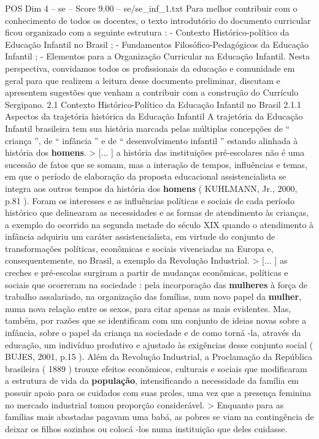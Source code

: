 \begin{textsample}{POS Dim 4 – se – Score 9.00 – se/se\_inf\_1.txt}
Para melhor contribuir com o conhecimento de todos os docentes, o texto introdutório do documento curricular ficou organizado com a seguinte estrutura : - Contexto Histórico-político da Educação Infantil no Brasil ; - Fundamentos Filosófico-Pedagógicos da Educação Infantil ; - Elementos para a Organização Curricular na Educação Infantil.
Nesta perspectiva, convidamos todos os profissionais da educação e comunidade em geral para que realizem a leitura desse documento preliminar, discutam e apresentem sugestões que venham a contribuir com a construção do Currículo Sergipano. 2.1 Contexto Histórico-Político da Educação Infantil no Brasil 2.1.1 Aspectos da trajetória histórica da Educação Infantil A trajetória da Educação Infantil brasileira tem sua história marcada pelas múltiplas concepções de “ criança ”, de “ infância ” e de “ desenvolvimento infantil ” estando alinhada à história dos \textbf{homens}. > [... ] a história das instituições pré-escolares não é uma sucessão de fatos que se somam, mas a interação de tempos, influências e temas, em que o período de elaboração da proposta educacional assistencialista se integra aos outros tempos da história dos \textbf{homens} ( KUHLMANN, Jr., 2000, p.81 ).
Foram os interesses e as influências políticas e sociais de cada período histórico que delinearam as necessidades e as formas de atendimento às crianças, a exemplo do ocorrido na segunda metade do século XIX quando o atendimento à infância adquiriu um caráter assistencialista, em virtude do conjunto de transformações políticas, econômicas e sociais vivenciadas na Europa e, consequentemente, no Brasil, a exemplo da Revolução Industrial. > [... ] as creches e pré-escolas surgiram a partir de mudanças econômicas, políticas e sociais que ocorreram na sociedade : pela incorporação das \textbf{mulheres} à força de trabalho assalariado, na organização das famílias, num novo papel da \textbf{mulher}, numa nova relação entre os sexos, para citar apenas as mais evidentes.
Mas, também, por razões que se identificam com um conjunto de ideias novas sobre a infância, sobre o papel da criança na sociedade e de como torná -la, através da educação, um indivíduo produtivo e ajustado às exigências desse conjunto social ( BUJES, 2001, p.15 ).
Além da Revolução Industrial, a Proclamação da República brasileira ( 1889 ) trouxe efeitos econômicos, culturais e sociais que modificaram a estrutura de vida da \textbf{população}, intensificando a necessidade da família em possuir apoio para os cuidados com suas proles, uma vez que a presença feminina no mercado industrial tomou proporção considerável. > Enquanto para as famílias mais abastadas pagavam uma babá, as pobres se viam na contingência de deixar os filhos sozinhos ou colocá -los numa instituição que deles cuidasse.

\end{textsample}
